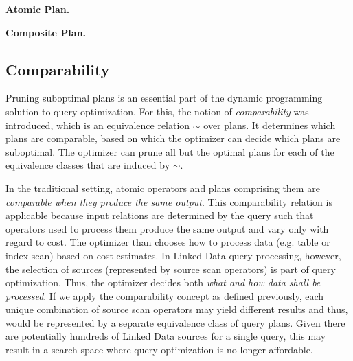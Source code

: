 \textbf{Atomic Plan.} 

  

\textbf{Composite Plan.} 

\subsection{Comparability}
\label{sec:comparability}

Pruning suboptimal plans is an essential part of the dynamic programming solution to
query optimization. 
For this, the notion of \emph{comparability} was introduced, which is an equivalence relation $\sim$ over plans. It determines which plans are comparable, based on which  
the optimizer can decide which plans are suboptimal. The optimizer can prune all but the optimal plans for each of the equivalence classes that are induced by $\sim$. 

In the traditional setting, atomic operators and plans comprising them are \emph{comparable when they produce the same output}. This comparability relation is applicable because input relations are determined by the query such that operators used to process them produce the same output and vary only with regard to cost. The optimizer than chooses how to process data (e.g. table or index
scan) based on cost estimates. In Linked Data query processing, however, the selection of
sources (represented by source scan operators) is part of query
optimization. Thus, the optimizer decides both \emph{what and how data shall be processed}. 
If we apply the comparability concept as defined
previously, each unique combination of source scan operators may yield different results and thus, would be represented by a separate equivalence class of query plans. Given there
are potentially hundreds of Linked Data sources for a single query, this may result in a search space where query optimization is no longer affordable.

